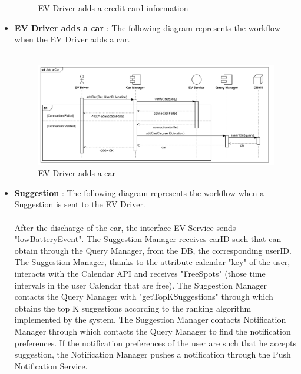 \begin{itemize}
\begin{figure}[H]
              \caption{EV Driver adds a credit card information}
          \end{figure}
    \item \textbf{EV Driver adds a car} : The following diagram represents the workflow when the EV Driver adds a car.\\
          \\
          \begin{figure}[H]
              \centering
              \includegraphics[scale=0.65]{src/runtimeView/eMSP_AddACar.pdf}
              \caption{EV Driver adds a car}
          \end{figure}
          \pagebreak
    \item \textbf{Suggestion} : The following diagram represents the workflow when a Suggestion is sent to the EV Driver.\\
          \\After the discharge of the car, the interface EV Service sends "lowBatteryEvent".
          The Suggestion Manager receives carID such that can obtain through the Query Manager, from the DB, the corresponding userID.
          The Suggestion Manager, thanks to the attribute calendar "key" of the user, interacts with the Calendar API and receives "FreeSpots" (those
          time intervals in the user Calendar that are free).
          The Suggestion Manager contacts the Query Manager with "getTopKSuggestions" through which obtains the top K suggestions according
          to the ranking algorithm implemented by the system.
          The Suggestion Manager contacts Notification Manager through which contacts the Query Manager to find the notification preferences.
          If the notification preferences of the user are such that he accepts suggestion, the Notification Manager pushes a notification through the Push Notification Service.
          \\
          \begin{figure}[H]
              \centering
              \hspace*{-2cm}

\end{figure}
\end{itemize}
